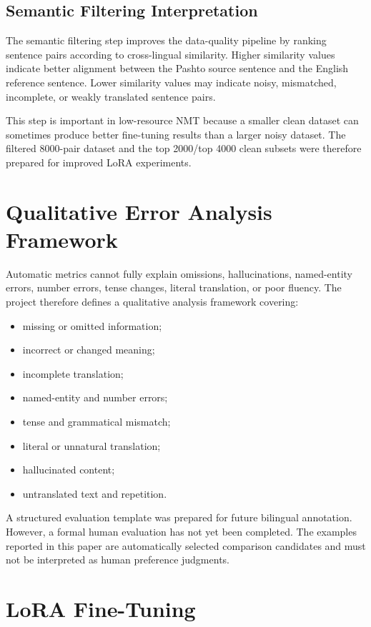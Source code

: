 \documentclass[conference]{IEEEtran}
\begin{document}
\subsection{Semantic Filtering Interpretation}

The semantic filtering step improves the data-quality pipeline by ranking sentence pairs according to cross-lingual similarity. Higher similarity values indicate better alignment between the Pashto source sentence and the English reference sentence. Lower similarity values may indicate noisy, mismatched, incomplete, or weakly translated sentence pairs.

This step is important in low-resource NMT because a smaller clean dataset can sometimes produce better fine-tuning results than a larger noisy dataset. The filtered 8000-pair dataset and the top 2000/top 4000 clean subsets were therefore prepared for improved LoRA experiments.

\section{Qualitative Error Analysis Framework}

Automatic metrics cannot fully explain omissions,
hallucinations, named-entity errors, number errors,
tense changes, literal translation, or poor fluency.
The project therefore defines a qualitative analysis
framework covering:

\begin{itemize}
    \item missing or omitted information;
    \item incorrect or changed meaning;
    \item incomplete translation;
    \item named-entity and number errors;
    \item tense and grammatical mismatch;
    \item literal or unnatural translation;
    \item hallucinated content;
    \item untranslated text and repetition.
\end{itemize}

A structured evaluation template was prepared for future
bilingual annotation. However, a formal human evaluation
has not yet been completed. The examples reported in this
paper are automatically selected comparison candidates and
must not be interpreted as human preference judgments.

\section{LoRA Fine-Tuning}
\end{document}
